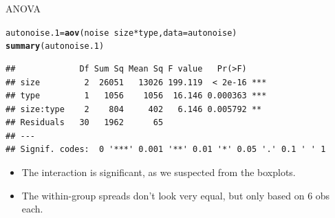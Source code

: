 \documentclass[unknownkeysallowed]{beamer}\usepackage[]{graphicx}\usepackage[]{color}
\makeatletter
\newcommand{\hlopt}[1]{\textcolor[rgb]{0,0,0}{#1}}%
\newcommand{\hlstd}[1]{\textcolor[rgb]{0.345,0.345,0.345}{#1}}%
\newcommand{\hlkwb}[1]{\textcolor[rgb]{0.69,0.353,0.396}{#1}}%
\newcommand{\hlkwc}[1]{\textcolor[rgb]{0.333,0.667,0.333}{#1}}%
\newcommand{\hlkwd}[1]{\textcolor[rgb]{0.737,0.353,0.396}{\textbf{#1}}}%
\newenvironment{kframe}{%
 \def\at@end@of@kframe{}%
 \ifinner\ifhmode%
  \def\at@end@of@kframe{\end{minipage}}%
  \begin{minipage}{\columnwidth}%
 \fi\fi%
 \def\FrameCommand##1{\hskip\@totalleftmargin \hskip-\fboxsep
 \colorbox{shadecolor}{##1}\hskip-\fboxsep
     \hskip-\linewidth \hskip-\@totalleftmargin \hskip\columnwidth}%
 \MakeFramed {\advance\hsize-\width
   \@totalleftmargin\z@ \linewidth\hsize
   \@setminipage}}%
 {\par\unskip\endMakeFramed%
 \at@end@of@kframe}
\newenvironment{knitrout}{}{} %
\makeatother
\begin{document}
\begin{frame}[fragile]{ANOVA}
  
\begin{knitrout}\small
{}\color{fgcolor}\begin{kframe}
\begin{alltt}
\hlstd{autonoise.1}\hlkwb{=}\hlkwd{aov}\hlstd{(noise}\hlopt{~}\hlstd{size}\hlopt{*}\hlstd{type,}\hlkwc{data}\hlstd{=autonoise)}
\hlkwd{summary}\hlstd{(autonoise.1)}
\end{alltt}
\begin{verbatim}
##             Df Sum Sq Mean Sq F value   Pr(>F)    
## size         2  26051   13026 199.119  < 2e-16 ***
## type         1   1056    1056  16.146 0.000363 ***
## size:type    2    804     402   6.146 0.005792 ** 
## Residuals   30   1962      65                     
## ---
## Signif. codes:  0 '***' 0.001 '**' 0.01 '*' 0.05 '.' 0.1 ' ' 1
\end{verbatim}
\end{kframe}
\end{knitrout}

\begin{itemize}
\item The interaction is significant, as we suspected from the boxplots.
\item The within-group spreads don't look very equal, but only based
  on 6 obs each.
\end{itemize}
  
\end{frame}
\end{document}
